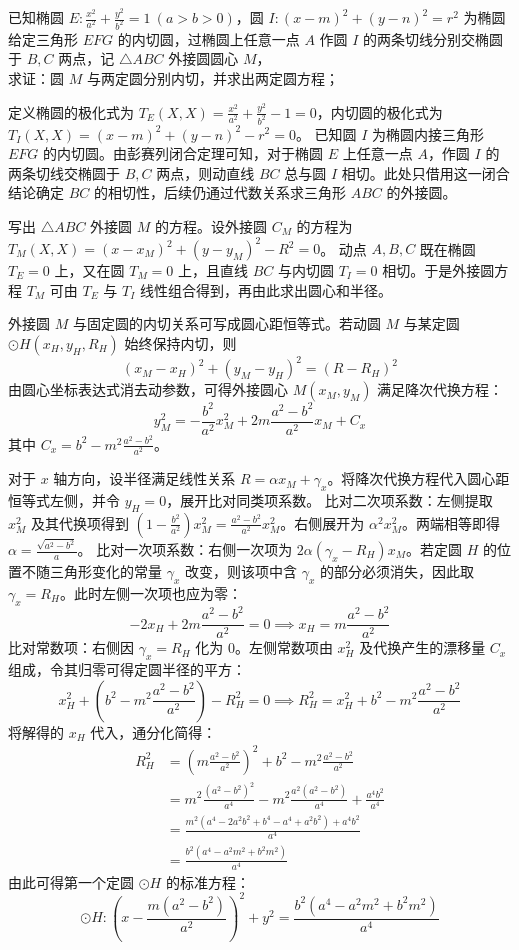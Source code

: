\begin{exercise}
已知椭圆 \(E: \frac{x^2}{a^2} + \frac{y^2}{b^2} = 1\ (a > b > 0)\)，圆 \(I: (x - m)^2 + (y - n)^2 = r^2\) 为椭圆给定三角形 \(EFG\) 的内切圆，过椭圆上任意一点 \(A\) 作圆 \(I\) 的两条切线分别交椭圆于 \(B,C\) 两点，记 \(\triangle ABC\) 外接圆圆心 \(M\)，\\
求证：圆 \(M\) 与两定圆分别内切，并求出两定圆方程；
\end{exercise}
\begin{solution}
定义椭圆的极化式为 $T_E(X,X) = \frac{x^2}{a^2} + \frac{y^2}{b^2} - 1 = 0$，内切圆的极化式为 $T_I(X,X) = (x-m)^2 + (y-n)^2 - r^2 = 0$。
已知圆 $I$ 为椭圆内接三角形 $EFG$ 的内切圆。由彭赛列闭合定理可知，对于椭圆 $E$ 上任意一点 $A$，作圆 $I$ 的两条切线交椭圆于 $B, C$ 两点，则动直线 $BC$ 总与圆 $I$ 相切。此处只借用这一闭合结论确定 $BC$ 的相切性，后续仍通过代数关系求三角形 $ABC$ 的外接圆。

写出 $\triangle ABC$ 外接圆 $M$ 的方程。设外接圆 $C_M$ 的方程为 $T_M(X,X) = (x-x_M)^2 + (y-y_M)^2 - R^2 = 0$。
动点 $A, B, C$ 既在椭圆 $T_E = 0$ 上，又在圆 $T_M = 0$ 上，且直线 $BC$ 与内切圆 $T_I = 0$ 相切。于是外接圆方程 $T_M$ 可由 $T_E$ 与 $T_I$ 线性组合得到，再由此求出圆心和半径。

外接圆 $M$ 与固定圆的内切关系可写成圆心距恒等式。若动圆 $M$ 与某定圆 $\odot H(x_H, y_H, R_H)$ 始终保持内切，则
$$ (x_M - x_H)^2 + (y_M - y_H)^2 = (R - R_H)^2 $$
由圆心坐标表达式消去动参数，可得外接圆心 $M(x_M, y_M)$ 满足降次代换方程：
$$ y_M^2 = -\frac{b^2}{a^2} x_M^2 + 2m \frac{a^2-b^2}{a^2} x_M + C_x $$
其中 $C_x = b^2 - m^2 \frac{a^2-b^2}{a^2}$。

对于 $x$ 轴方向，设半径满足线性关系 $R = \alpha x_M + \gamma_x$。将降次代换方程代入圆心距恒等式左侧，并令 $y_H = 0$，展开比对同类项系数。
比对二次项系数：左侧提取 $x_M^2$ 及其代换项得到 $\left(1 - \frac{b^2}{a^2}\right)x_M^2 = \frac{a^2-b^2}{a^2} x_M^2$。右侧展开为 $\alpha^2 x_M^2$。两端相等即得 $\alpha = \frac{\sqrt{a^2-b^2}}{a}$。
比对一次项系数：右侧一次项为 $2\alpha(\gamma_x - R_H)x_M$。若定圆 $H$ 的位置不随三角形变化的常量 $\gamma_x$ 改变，则该项中含 $\gamma_x$ 的部分必须消失，因此取 $\gamma_x = R_H$。此时左侧一次项也应为零：
$$ -2x_H + 2m \frac{a^2-b^2}{a^2} = 0 \implies x_H = m \frac{a^2-b^2}{a^2} $$
比对常数项：右侧因 $\gamma_x = R_H$ 化为 $0$。左侧常数项由 $x_H^2$ 及代换产生的漂移量 $C_x$ 组成，令其归零可得定圆半径的平方：
$$ x_H^2 + \left(b^2 - m^2 \frac{a^2-b^2}{a^2}\right) - R_H^2 = 0 \implies R_H^2 = x_H^2 + b^2 - m^2 \frac{a^2-b^2}{a^2} $$
将解得的 $x_H$ 代入，通分化简得：
\begin{align*}
R_H^2 &= \left(m \frac{a^2-b^2}{a^2}\right)^2 + b^2 - m^2 \frac{a^2-b^2}{a^2} \\
&= m^2 \frac{(a^2-b^2)^2}{a^4} - m^2 \frac{a^2(a^2-b^2)}{a^4} + \frac{a^4 b^2}{a^4} \\
&= \frac{m^2 (a^4 - 2a^2b^2 + b^4 - a^4 + a^2b^2) + a^4 b^2}{a^4} \\
&= \frac{b^2(a^4 - a^2m^2 + b^2m^2)}{a^4}
\end{align*}
由此可得第一个定圆 $\odot H$ 的标准方程：
$$ \odot H: \left(x - \frac{m(a^2 - b^2)}{a^2}\right)^2 + y^2 = \frac{b^2(a^4 - a^2m^2 + b^2m^2)}{a^4} $$


\end{solution}
